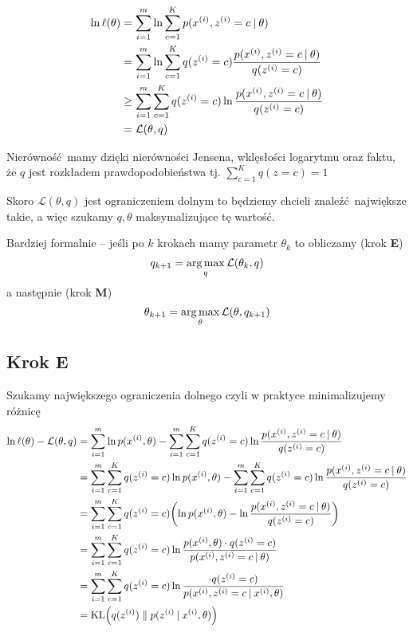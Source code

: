 \begin{align*}
	\ln \ell(\theta)
	 & = \sum_{i=1}^m \ln \sum_{c=1}^K p(x^{(i)}, z^{(i)} = c \:\vert\: \theta)                                        \\
	 & = \sum_{i=1}^m \ln \sum_{c=1}^K q(z^{(i)} = c) \frac{p(x^{(i)}, z^{(i)} = c \:\vert\: \theta)}{q(z^{(i)}=c)}    \\
	 & \geq \sum_{i=1}^m \sum_{c=1}^K q(z^{(i)} = c) \ln \frac{p(x^{(i)}, z^{(i)} = c \:\vert\: \theta)}{q(z^{(i)}=c)} \\
	 & = \mathcal{L}(\theta, q)
\end{align*}

Nierówność mamy dzięki nierówności Jensena, wklęsłości logarytmu oraz faktu, że \( q \) jest rozkładem prawdopodobieństwa tj. \( \sum_{c=1}^K q(z = c) = 1 \)

Skoro \( \mathcal{L}(\theta, q) \) jest ograniczeniem dolnym to będziemy chcieli znaleźć największe takie, a więc szukamy \( q, \theta \) maksymalizujące tę wartość.

Bardziej formalnie -- jeśli po \( k \) krokach mamy parametr \( \theta_k \) to obliczamy (krok \textbf{E})
\[
	q_{k + 1} = \operatorname*{arg\,max}_q \mathcal{L}(\theta_k, q)
\]
a następnie (krok \textbf{M})
\[
	\theta_{k + 1} = \operatorname*{arg\,max}_\theta \mathcal{L}(\theta, q_{k + 1})
\]

\subsection{Krok E}

Szukamy największego ograniczenia dolnego czyli w praktyce minimalizujemy różnicę
\begin{align*}
	\ln \ell(\theta) - \mathcal{L}(\theta, q)
	 & = \sum_{i=1}^m \ln p(x^{(i)}, \theta) - \sum_{i=1}^m \sum_{c=1}^K q(z^{(i)} = c) \ln \frac{p(x^{(i)}, z^{(i)} = c \given \theta)}{q(z^{(i)}=c)}                             \\
	 & = \sum_{i=1}^m \sum_{c=1}^K q(z^{(i)} = c) \ln p(x^{(i)}, \theta) - \sum_{i=1}^m \sum_{c=1}^K q(z^{(i)} = c) \ln \frac{p(x^{(i)}, z^{(i)} = c \given \theta)}{q(z^{(i)}=c)} \\
	 & = \sum_{i=1}^m \sum_{c=1}^K  q(z^{(i)} = c) \pars{\ln p(x^{(i)}, \theta) - \ln \frac{p(x^{(i)}, z^{(i)} = c \given \theta)}{q(z^{(i)}=c)}}                                  \\
	 & = \sum_{i=1}^m \sum_{c=1}^K q(z^{(i)} = c) \ln \frac{p(x^{(i)}, \theta) \cdot q(z^{(i)}=c)}{p(x^{(i)}, z^{(i)} = c \given \theta)}                                          \\
	 & = \sum_{i=1}^m \sum_{c=1}^K q(z^{(i)} = c) \ln \frac{\cdot q(z^{(i)}=c)}{p(x^{(i)}, z^{(i)} = c \given x^{(i)}, \theta)}                                                    \\
	 & = \KL{q(z^{(i)})}{p(z^{(i)} \given x^{(i)}, \theta)}
\end{align*}

